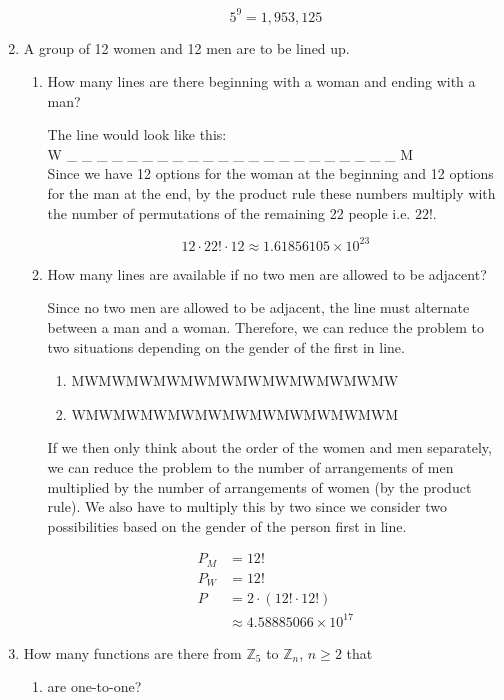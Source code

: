 \documentclass[letterpaper, 12pt]{article}
\newcommand{\Z}{\mathbb{Z}}
\newcommand{\0}{\emptyset}
\begin{document}
\begin{enumerate}
\begin{enumerate}
\[
    5^9 = 1,953,125
\]
\end{enumerate}
\item A group of 12 women and 12 men are to be lined up.
\begin{enumerate}
\item How many lines are there beginning with a woman and ending with a man?
\begin{flushleft}
    The line would look like this: \\
    W \_ \_ \_ \_ \_ \_ \_ \_ \_ \_ \_ \_ \_ \_ \_ \_ \_ \_ \_ \_ \_ \_ M \\
    Since we have 12 options for the woman at the beginning and 12 options for the man at the end, 
    by the product rule these numbers multiply with the number of permutations of the remaining 
    22 people i.e. $22!$.
\end{flushleft}
\[
    12 \cdot 22! \cdot 12 \approx 1.61856105\times10^{23}
\]
\item How many lines are available if no two men are allowed to be adjacent?
\begin{flushleft}
    Since no two men are allowed to be adjacent, the line must alternate between a man and a 
    woman. Therefore, we can reduce the problem to two situations depending on the gender of 
    the first in line.
    \begin{enumerate}
        \item MWMWMWMWMWMWMWMWMWMWMWMW
        \item WMWMWMWMWMWMWMWMWMWMWMWM
    \end{enumerate}
    If we then only think about the order of the women and men separately, we can reduce the 
    problem to the number of arrangements of men multiplied by the number of arrangements of 
    women (by the product rule). We also have to multiply this by two since we consider two 
    possibilities based on the gender of the person first in line.
\end{flushleft}
\begin{align*}
    P_M &= 12! \\
    P_W &= 12! \\
    P &= 2 \cdot (12! \cdot 12!) \\
    &\approx 4.58885066\times10^{17}
\end{align*}
\end{enumerate}
\item How many functions are there from $\Z_5$ to $\Z_n$, $n \ge 2$ that 
\begin{enumerate}
\item are one-to-one?

\end{enumerate}
\end{enumerate}
\end{document}
